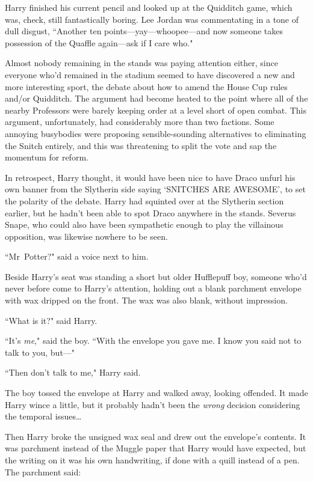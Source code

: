 Harry finished his current pencil and looked up at the Quidditch game, which was, check, still fantastically boring. Lee Jordan was commentating in a tone of dull disgust, ``Another ten points—yay—whoopee—and now someone takes possession of the Quaffle again—ask if I care who."

Almost nobody remaining in the stands was paying attention either, since everyone who'd remained in the stadium seemed to have discovered a new and more interesting sport, the debate about how to amend the House Cup rules and/or Quidditch. The argument had become heated to the point where all of the nearby Professors were barely keeping order at a level short of open combat. This argument, unfortunately, had considerably more than two factions. Some annoying busybodies were proposing sensible-sounding alternatives to eliminating the Snitch entirely, and this was threatening to split the vote and sap the momentum for reform.

In retrospect, Harry thought, it would have been nice to have Draco unfurl his own banner from the Slytherin side saying `SNITCHES ARE AWESOME', to set the polarity of the debate. Harry had squinted over at the Slytherin section earlier, but he hadn't been able to spot Draco anywhere in the stands. Severus Snape, who could also have been sympathetic enough to play the villainous opposition, was likewise nowhere to be seen.

``Mr~Potter?" said a voice next to him.

Beside Harry's seat was standing a short but older Hufflepuff boy, someone who'd never before come to Harry's attention, holding out a blank parchment envelope with wax dripped on the front. The wax was also blank, without impression.

``What is it?" said Harry.

``It's \emph{me}," said the boy. ``With the envelope you gave me. I know you said not to talk to you, but—"

``Then don't talk to me," Harry said.

The boy tossed the envelope at Harry and walked away, looking offended. It made Harry wince a little, but it probably hadn't been the \emph{wrong} decision considering the temporal issues{\ldots}

Then Harry broke the unsigned wax seal and drew out the envelope's contents. It was parchment instead of the Muggle paper that Harry would have expected, but the writing on it was his own handwriting, if done with a quill instead of a pen. The parchment said:

